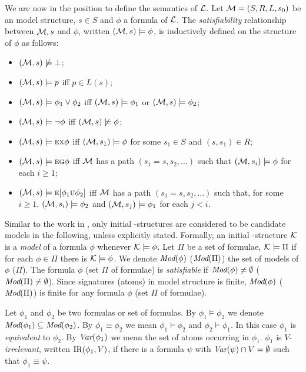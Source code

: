 \documentclass{article}
\begin{document}
We are now in the position to define the semantics of $\cal L$.
Let ${\cal M}=(S,R,L,s_0)$ be an model structure, $s\in S$ and $\phi$ a formula of $\cal L$.
The {\em satisfiability} relationship between ${\cal M},s$ and $\phi$,
written $({\cal M},s)\models\phi$, is inductively defined on the structure of $\phi$ as follows:
\begin{itemize}
  \item $({\cal M},s)\not\models\bot$;
  \item $({\cal M},s)\models p$ iff $p\in L(s)$;
  \item $({\cal M},s)\models \phi_1\lor\phi_2$ iff
    $({\cal M},s)\models \phi_1$ or $({\cal M},s)\models \phi_2$;
  \item $({\cal M},s)\models \neg\phi$ iff  $({\cal M},s)\not\models\phi$;
  \item $({\cal M},s)\models \textsc{e}\textsc{x}\phi$ iff
    $({\cal M},s_1)\models\phi$ for some $s_1\in S$ and $(s,s_1)\in R$;
  \item $({\cal M},s)\models \textsc{e}\textsc{g}\phi$ iff
    $\cal M$ has a path $(s_1=s,s_2,\ldots)$ such that
    $({\cal M},s_i)\models\phi$ for each $i\ge 1$;
  \item $({\cal M},s)\models \textsc{e}[\phi_1\textsc{u}\phi_2]$ iff
    $\cal M$ has a path $(s_1=s,s_2,\ldots)$ such that, for some $i\ge 1$,
    $({\cal M},s_i)\models\phi_2$ and
    $({\cal M},s_j)\models\phi_1$ for each $j<i$.
\end{itemize}

Similar to the work in \cite{DBLP:journals/tcs/BrowneCG88,Bolotov:1999:JETAI},
only initial \MPK-structures are considered to be candidate models
in the following, unless explicitly stated. Formally,
an initial \MPK-structure $\cal K$ is a {\em model} of a formula $\phi$
whenever ${\cal K}\models\phi$.
Let $\Pi$ be a set of formulae, ${\cal K} \models \Pi$ if for each $\phi\in \Pi$ there is $\cal K \models \phi$.
We denote $\textit{Mod}(\phi)$  ($\textit{Mod}(\Pi)$) the set of models of $\phi$ ($\Pi$).
The formula $\phi$ (set $\Pi$ of formulae) is {\em satisfiable}
if $\textit{Mod}(\phi)\neq\emptyset$ ($\textit{Mod}(\Pi)\neq\emptyset$).
Since signatures (atoms) in model structure is finite, $\textit{Mod}(\phi)$ ($\textit{Mod}(\Pi)$)
is finite for any formula $\phi$ (set $\Pi$ of formulae).

Let $\phi_1$ and $\phi_2$ be two formulas or set of formulas.
By $\phi_1\models\phi_2$ we denote $\textit{Mod}(\phi_1)\subseteq\textit{Mod}(\phi_2)$.
By $\phi_1\equiv\phi_2$ we mean $\phi_1\models\phi_2$ and $\phi_2\models\phi_1$.
In this case $\phi_1$ is {\em equivalent} to $\phi_2$.
By $\textit{Var}(\phi_1)$ we mean the set of atoms occurring in $\phi_1$.
 $\phi_1$ is $V$-{\em irrelevant}, written $\textrm{IR}(\phi_1,V)$,
if there is a formula $\psi$ with
$\textit{Var}(\psi)\cap V=\emptyset$ such that $\phi_1\equiv\psi$.
\end{document}
